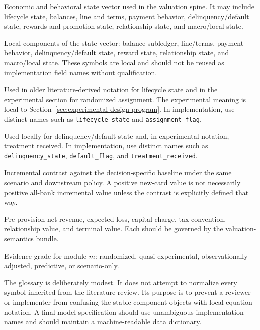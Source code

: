 \documentclass[11pt]{article}
\newcommand{\EL}{\mathrm{EL}}
\newcommand{\PPNR}{\mathrm{PPNR}}
\newcommand{\1}{\mathbf{1}}
\newcommand{\code}[1]{\nolinkurl{#1}}
\begin{document}
\begin{description}[leftmargin=*,style=nextline]
  \item[$S_{it}$]
  Economic and behavioral state vector used in the valuation spine. It may
  include lifecycle state, balances, line and terms, payment behavior,
  delinquency/default state, rewards and promotion state, relationship state,
  and macro/local state.

  \item[$B$, $L$, $P$, $D$, $Rwd$, $Rel$, and $M$]
  Local components of the state vector: balance subledger, line/terms, payment
  behavior, delinquency/default state, reward state, relationship state, and
  macro/local state. These symbols are local and should not be reused as
  implementation field names without qualification.

  \item[$Z$]
  Used in older literature-derived notation for lifecycle state and in the
  experimental section for randomized assignment. The experimental meaning is
  local to Section~\ref{sec:experimental-design-program}. In implementation,
  use distinct names such as \code{lifecycle_state} and
  \code{assignment_flag}.

  \item[$D$]
  Used locally for delinquency/default state and, in experimental notation,
  treatment received. In implementation, use distinct names such as
  \code{delinquency_state}, \code{default_flag}, and
  \code{treatment_received}.

  \item[$\Delta$]
  Incremental contrast against the decision-specific baseline under the same
  scenario and downstream policy. A positive new-card value is not necessarily
  positive all-bank incremental value unless the contrast is explicitly defined
  that way.

  \item[$\PPNR$, $\EL$, $Kchg$, $Tax$, $RelValue$, and $TV$]
  Pre-provision net revenue, expected loss, capital charge, tax convention,
  relationship value, and terminal value. Each should be governed by the
  valuation-semantics bundle.

  \item[$G_m$]
  Evidence grade for module $m$: randomized, quasi-experimental,
  observationally adjusted, predictive, or scenario-only.
\end{description}

The glossary is deliberately modest. It does not attempt to normalize every
symbol inherited from the literature review. Its purpose is to prevent a
reviewer or implementer from confusing the stable component objects with local
equation notation. A final model specification should use unambiguous
implementation names and should maintain a machine-readable data dictionary.
\end{document}
